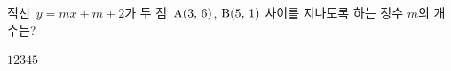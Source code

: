 직선~$y=mx+m+2$가 두 점~$\mathrm{A}(3,\mkern3mu 6)$, $\mathrm{B}(5,\mkern3mu 1)$ 사이를 지나도록 하는 정수 $m$의 개수는?
\begin{choices32}{$1$}{$2$}{$3$}{$4$}{$5$}\end{choices32}
